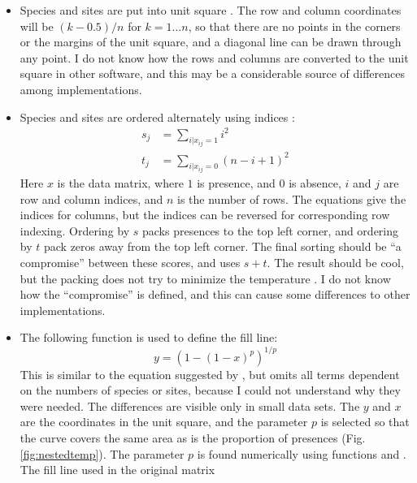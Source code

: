 \documentclass[a4paper,10pt,twocolumn]{article}
\begin{document}
\begin{itemize}
\item Species and sites are put into unit square \citep{RodGir06}. The
  row and column coordinates will be $(k-0.5)/n$ for $k=1 \ldots n$,
  so that there are no points in the corners or the margins of the
  unit square, and a diagonal line can be drawn through any point. I
  do not know how the rows and columns are converted to the unit
  square in other software, and this may be a considerable source of
  differences among implementations.
  \item Species and sites are ordered alternately using indices
    \citep{RodGir06}:
    \begin{equation}
    \begin{split}
      s_j &= \sum_{i|x_{ij} = 1} i^2 \\
      t_j &= \sum_{i|x_{ij} = 0} (n-i+1)^2 
    \end{split}
    \end{equation}
    Here $x$ is the data matrix, where $1$ is presence, and $0$ is
    absence, $i$ and $j$ are row and column indices, and $n$ is the
    number of rows. The equations give the indices for columns, but
    the indices can be reversed for corresponding row indexing.
    Ordering by $s$ packs presences to the top left corner, and
    ordering by $t$ pack zeros away from the top left corner. The final
    sorting should be ``a compromise'' \citep{RodGir06} between these
    scores, and  uses $s+t$.  The result should be cool,
    but the packing does not try to minimize the temperature
    \citep{RodGir06}.  I do not know how the ``compromise'' is
    defined, and this can cause some differences to other
    implementations.
  \item The following function is used to define the fill line:
    \begin{equation}
      y = (1-(1-x)^p)^{1/p}
    \end{equation}
    This is similar to the equation suggested by
    \citet[eq. 4]{RodGir06}, but omits all terms dependent on the
    numbers of species or sites, because I could not understand why
    they were needed. The differences are visible only in small data
    sets. The $y$ and $x$ are the coordinates in the unit square, and
    the parameter $p$ is selected so that the curve covers the same
    area as is the proportion of presences
    (Fig. \ref{fig:nestedtemp}). The parameter $p$ is found
    numerically using  functions  and
    .  The fill line used in the original matrix

\end{itemize}
\end{document}
